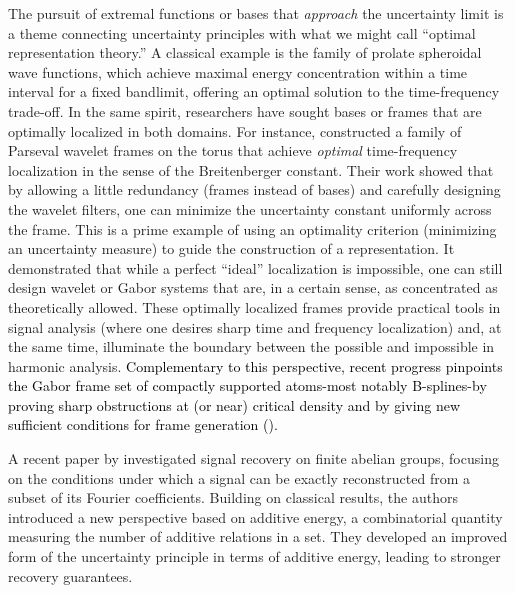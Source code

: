 \documentclass[preprint,hidelinks,authoryear]{elsarticle}
\theoremstyle{plain}
\theoremstyle{definition}
\theoremstyle{remark}
\begin{document}
The pursuit of extremal functions or bases that \emph{approach} the uncertainty limit is a theme connecting uncertainty principles with what we might call “optimal representation theory.”  A classical example is the family of prolate spheroidal wave functions, which achieve maximal energy concentration within a time interval for a fixed bandlimit, offering an optimal solution to the time-frequency trade-off. In the same spirit, researchers have sought bases or frames that are optimally localized in both domains.  For instance, \cite{lebedeva2014periodic} constructed a family of Parseval wavelet frames on the torus that achieve \emph{optimal} time-frequency localization in the sense of the Breitenberger constant.  Their work showed that by allowing a little redundancy (frames instead of bases) and carefully designing the wavelet filters, one can minimize the uncertainty constant uniformly across the frame.  This is a prime example of using an optimality criterion (minimizing an uncertainty measure) to guide the construction of a representation. It demonstrated that while a perfect “ideal” localization is impossible, one can still design wavelet or Gabor systems that are, in a certain sense, as concentrated as theoretically allowed. These optimally localized frames provide practical tools in signal analysis (where one desires sharp time and frequency localization) and, at the same time, illuminate the boundary between the possible and impossible in harmonic analysis. \textcolor{black}{Complementary to this perspective, recent progress pinpoints the Gabor frame set of compactly supported atoms-most notably B-splines-by proving sharp obstructions at (or near) critical density and by giving new sufficient conditions for frame generation (\cite{ghosh2025gabor,ghosh2025obstructions}).}

A recent paper by \cite{aldahleh2025additive} investigated signal recovery on finite abelian groups, focusing on the conditions under which a signal can be exactly reconstructed from a subset of its Fourier coefficients. Building on classical results, the authors introduced a new perspective based on additive energy, a combinatorial quantity measuring the number of additive relations in a set. They developed an improved form of the uncertainty principle in terms of additive energy, leading to stronger recovery guarantees. 
\end{document}
